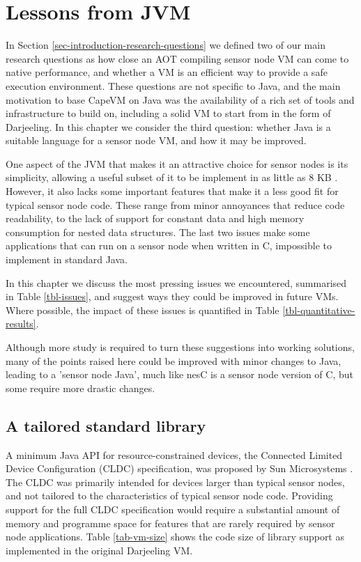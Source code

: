 \chapter{Lessons from JVM}



\label{sec-lessons-from-jvm}

In Section \ref{sec-introduction-research-questions} we defined two of our main research questions as how close an AOT compiling sensor node VM can come to native performance, and whether a VM is an efficient way to provide a safe execution environment. These questions are not specific to Java, and the main motivation to base CapeVM on Java was the availability of a rich set of tools and infrastructure to build on, including a solid VM to start from in the form of Darjeeling. In this chapter we consider the third question: whether Java is a suitable language for a sensor node VM, and how it may be improved.

One aspect of the JVM that makes it an attractive choice for sensor nodes is its simplicity, allowing a useful subset of it to be implement in as little as 8 KB \cite{Harbaum}. However, it also lacks some important features that make it a less good fit for typical sensor node code. These range from minor annoyances that reduce code readability, to the lack of support for constant data and high memory consumption for nested data structures. The last two issues make some applications that can run on a sensor node when written in C, impossible to implement in standard Java.

In this chapter we discuss the most pressing issues we encountered, summarised in Table \ref{tbl-issues}, and suggest ways they could be improved in future VMs. Where possible, the impact of these issues is quantified in Table \ref{tbl-quantitative-results}.

Although more study is required to turn these suggestions into working solutions, many of the points raised here could be improved with minor changes to Java, leading to a 'sensor node Java', much like nesC \cite{Gay:2003up} is a sensor node version of C, but some require more drastic changes.




\section{A tailored standard library}
\label{sec-std-lib}

A minimum Java API for resource-constrained devices, the Connected Limited Device Configuration (CLDC) specification, was proposed by Sun Microsystems \cite{CLDC}. The CLDC was primarily intended for devices larger than typical sensor nodes, and not tailored to the characteristics of typical sensor node code. Providing support for the full CLDC specification would require a substantial amount of memory and programme space for features that are rarely required by sensor node applications. Table \ref{tab-vm-size} shows the code size of library support as implemented in the original Darjeeling VM.

